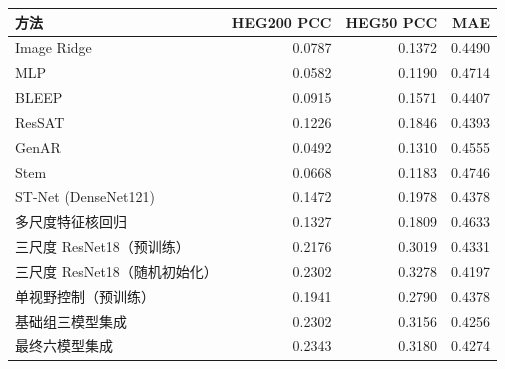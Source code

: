 \begin{tabular}{lrrr}
\toprule
方法 & HEG200 PCC & HEG50 PCC & MAE \\
\midrule
Image Ridge & 0.0787 & 0.1372 & 0.4490 \\
MLP & 0.0582 & 0.1190 & 0.4714 \\
BLEEP & 0.0915 & 0.1571 & 0.4407 \\
ResSAT & 0.1226 & 0.1846 & 0.4393 \\
GenAR & 0.0492 & 0.1310 & 0.4555 \\
Stem & 0.0668 & 0.1183 & 0.4746 \\
ST-Net (DenseNet121) & 0.1472 & 0.1978 & 0.4378 \\
多尺度特征核回归 & 0.1327 & 0.1809 & 0.4633 \\
三尺度 ResNet18（预训练） & 0.2176 & 0.3019 & 0.4331 \\
三尺度 ResNet18（随机初始化） & 0.2302 & 0.3278 & 0.4197 \\
单视野控制（预训练） & 0.1941 & 0.2790 & 0.4378 \\
基础组三模型集成 & 0.2302 & 0.3156 & 0.4256 \\
最终六模型集成 & 0.2343 & 0.3180 & 0.4274 \\
\bottomrule
\end{tabular}
